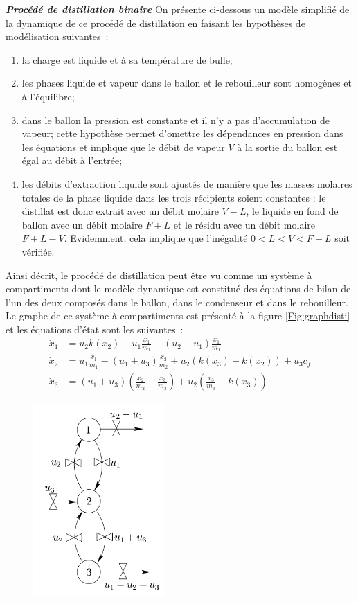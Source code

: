 \begin{exemple}{\bf \em Procédé de distillation binaire}
On présente ci-dessous un modèle simplifié de la dynamique de ce procédé de distillation en faisant les
hypothèses de modélisation suivantes~:
\begin{enumerate}
\item la charge est liquide et à sa température de bulle;
\item les phases liquide et vapeur dans le ballon et le rebouilleur sont homogènes et à
l'équilibre;
\item dans le ballon la pression est constante et il n'y a pas d'accumulation de vapeur; cette hypothèse permet d'omettre les dépendances en pression dans les équations et implique que le débit de vapeur $V$  à la sortie du ballon est égal au débit à l'entrée; 
\item les débits d'extraction liquide sont ajustés de manière que les masses molaires totales de la phase liquide dans les trois récipients soient constantes : le distillat est donc extrait avec un débit molaire $V-L$, le liquide en fond de ballon avec un débit molaire $F+L$ et le résidu avec un débit molaire $F+L-V$. Evidemment, cela implique que l'inégalité $0 < L < V < F+L$ soit vérifiée.\\
\end{enumerate}
Ainsi décrit, le procédé de distillation peut être vu comme un système à
compartiments dont le modèle dynamique est constitué des
équations de bilan de l'un des deux composés dans le ballon, dans le condenseur et dans le rebouilleur. Le graphe de ce système à
compartiments est présenté à la figure \ref{Fig:graphdisti} et les équations
d'état sont les suivantes~:
\begin{equation*} \begin{split}
\dot x_1 &= u_2 k(x_2) - u_{1}\frac{x_1}{m_1} - (u_2 - u_1) \frac{x_1}{m_1}\\
\dot x_2 &= u_1\frac{x_1}{m_1} - (u_1+u_3)\frac{x_2}{m_2} + u_2(k(x_3) - k(x_2)) + u_3c_f\\
\dot x_3 &= (u_1 + u_3)(\frac{x_2}{m_2} - \frac{x_3}{m_3}) + u_2(\frac{x_3}{m_3} - k(x_3))
\end{split} \end{equation*}
\begin{figure}[h]
\begin{center}
\includegraphics[width=5cm]{images/graphprocdistil}

\end{center}
\end{figure}
\end{exemple}
